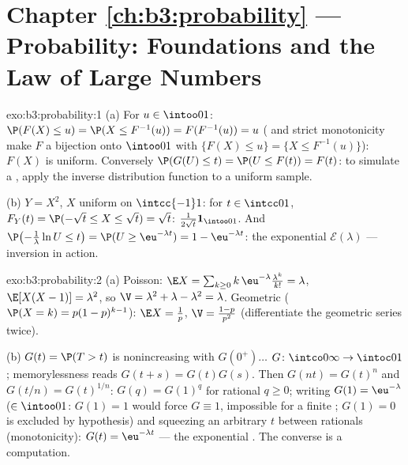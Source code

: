 \section*{Chapter \ref{ch:b3:probability} --- Probability:
Foundations and the Law of Large Numbers}

\begin{solution}{exo:b3:probability:1}
(a) For $u \in \intoo01$: $\P(F(X) \leq u) = \P(X \leq
F^{-1}(u)) = F(F^{-1}(u)) = u$ ( and strict
monotonicity make $F$ a bijection onto $\intoo01$ with
$\{F(X) \leq u\} = \{X \leq F^{-1}(u)\}$): $F(X)$ is uniform.
Conversely $\P(G(U) \leq t) = \P(U \leq F(t)) = F(t)$: to
simulate a , apply the inverse distribution function to a
uniform sample.

(b) $Y = X^2$, $X$ uniform on $\intcc{-1}1$: for $t \in
\intcc01$, $F_Y(t) = \P(-\sqrt t \leq X \leq \sqrt t) = \sqrt
t$:  $\frac1{2\sqrt t}\mathbf 1_{\intoo01}$. And
$\P\bigl(-\frac1\lambda\ln U \leq t\bigr) = \P(U \geq
\eu^{-\lambda t}) = 1 - \eu^{-\lambda t}$: the exponential
$\mathcal E(\lambda)$ --- inversion in action.
\end{solution}

\begin{solution}{exo:b3:probability:2}
(a) Poisson: $\E X = \sum_{k\geq0}k\,\eu^{-\lambda}
\frac{\lambda^k}{k!} = \lambda$, $\E[X(X-1)] = \lambda^2$, so
$\V = \lambda^2 + \lambda - \lambda^2 = \lambda$. Geometric
($\P(X = k) = p(1-p)^{k-1}$): $\E X = \frac1p$, $\V =
\frac{1-p}{p^2}$ (differentiate the geometric series twice).

(b) $G(t) = \P(T > t)$ is nonincreasing with $G(0^+)\dots$
$G \colon \intco0\infty \to \intoc01$; memorylessness reads
$G(t + s) = G(t)G(s)$. Then $G(n t) = G(t)^n$ and $G(t/n) =
G(t)^{1/n}$: $G(q) = G(1)^q$ for rational $q \geq 0$; writing
$G(1) = \eu^{-\lambda}$ ($\in \intoo01$: $G(1) = 1$ would
force $G \equiv 1$, impossible for a finite ;
$G(1) = 0$ is excluded by hypothesis) and squeezing an
arbitrary $t$ between rationals (monotonicity): $G(t) =
\eu^{-\lambda t}$ --- the exponential . The converse is a
computation.
\end{solution}

